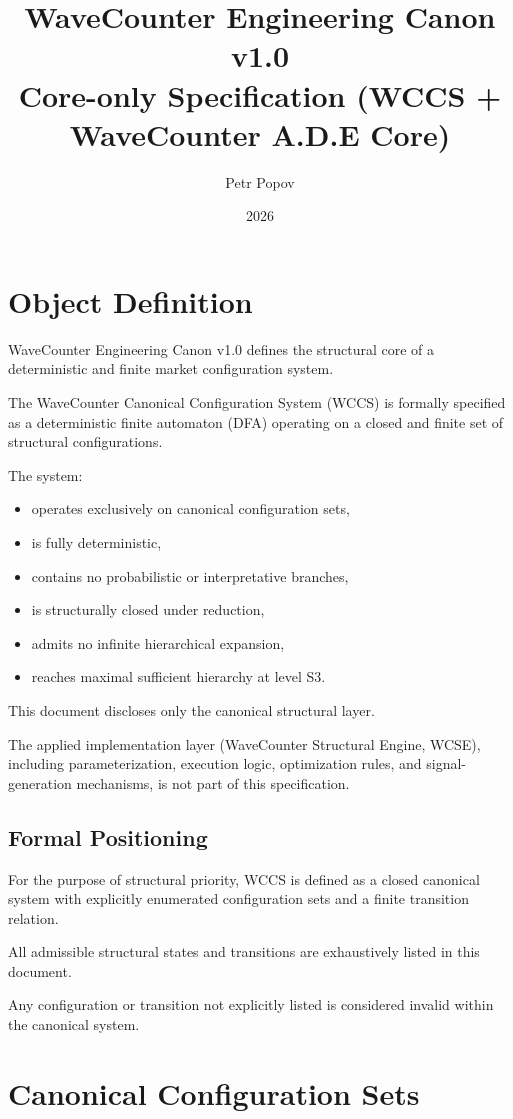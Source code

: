 \documentclass[11pt]{article}
\title{WaveCounter Engineering Canon v1.0\\
\large Core-only Specification (WCCS + WaveCounter A.D.E Core)}
\author{Petr Popov}
\date{2026}
\begin{document}
\maketitle

\section{Object Definition}

WaveCounter Engineering Canon v1.0 defines the structural core of a deterministic and finite market configuration system.

The WaveCounter Canonical Configuration System (WCCS) is formally specified as a deterministic finite automaton (DFA) operating on a closed and finite set of structural configurations.

The system:

\begin{itemize}
\item operates exclusively on canonical configuration sets,
\item is fully deterministic,
\item contains no probabilistic or interpretative branches,
\item is structurally closed under reduction,
\item admits no infinite hierarchical expansion,
\item reaches maximal sufficient hierarchy at level S3.
\end{itemize}

This document discloses only the canonical structural layer.

The applied implementation layer (WaveCounter Structural Engine, WCSE), including parameterization, execution logic, optimization rules, and signal-generation mechanisms, is not part of this specification.
\subsection*{Formal Positioning}

For the purpose of structural priority, WCCS is defined as a closed canonical system with explicitly enumerated configuration sets and a finite transition relation.

All admissible structural states and transitions are exhaustively listed in this document.

Any configuration or transition not explicitly listed is considered invalid within the canonical system.
\section{Canonical Configuration Sets}
\end{document}
